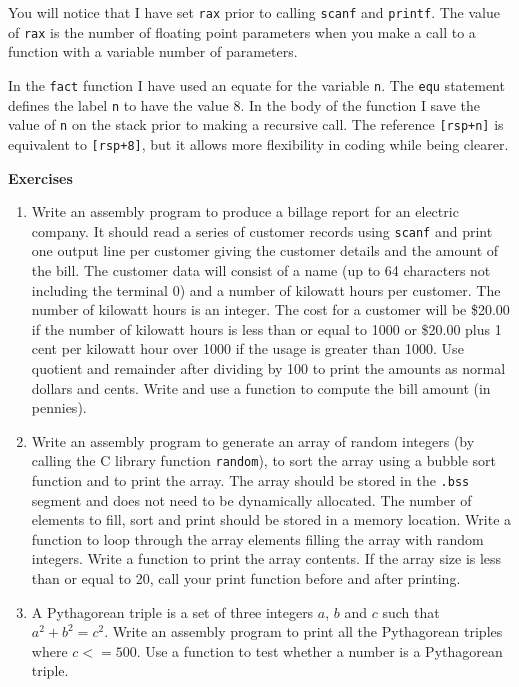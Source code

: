 \documentclass[11pt,b5paper]{book}
\begin{document}
You will notice that I have set {\tt rax} prior to calling {\tt scanf} and
{\tt printf}.
The value of {\tt rax} is the number of floating point parameters when you
make a call to a function with a variable number of parameters.

In the {\tt fact} function I have used an equate for the variable {\tt n}.  
The {\tt equ} statement defines the label {\tt n} to have the value 8.
In the body of the function I save the value of {\tt n} on the stack prior to
making a recursive call.
The reference {\tt [rsp+n]} is equivalent to {\tt [rsp+8]}, but it allows more
flexibility in coding while being clearer.

\vfill
\break
{\bf\large Exercises}

\begin{enumerate}
    \item Write an assembly program to produce a billage report for an electric company.
    It should read a series of customer records using {\tt scanf} and print one output line per
    customer giving the customer details and the amount of the bill.
    The customer data will consist of a name (up to 64 characters not including the terminal 0) and
    a number of kilowatt hours per customer.
    The number of kilowatt hours is an integer.
    The cost for a customer will be \$20.00 if the number of kilowatt hours is less than or equal to 1000 or \$20.00
    plus 1 cent per kilowatt hour over 1000 if the usage is greater than 1000.
    Use quotient and remainder after dividing by 100 to print the amounts as normal dollars and cents.
    Write and use a function to compute the bill amount (in pennies).
    
    \item Write an assembly program to generate an array of random integers (by calling the C library
    function {\tt random}), to sort the array using a bubble sort function and to print the array.
    The array should be stored in the {\tt .bss} segment and does not need to be dynamically allocated.
    The number of elements to fill, sort and print should be stored in a memory location.
    Write a function to loop through the array elements filling the array with random integers.
    Write a function to print the array contents.
    If the array size is less than or equal to 20, call your print function before and after printing.
    
    \item A Pythagorean triple is a set of three integers $a$, $b$ and $c$ such that
     $a^2+b^2=c^2$.  Write an assembly program to print all the Pythagorean triples where $c <= 500$.
     Use a function to test whether a number is a Pythagorean triple.
     

\end{enumerate}
\end{document}
